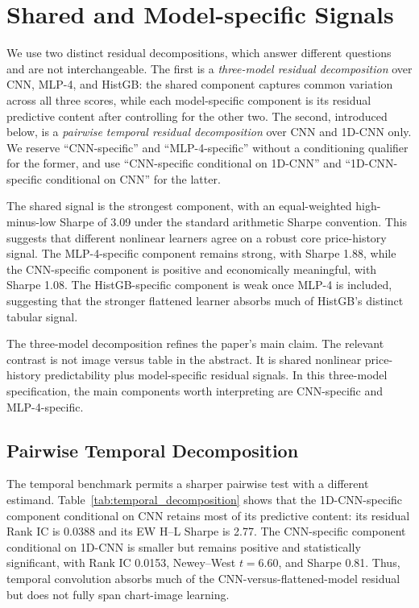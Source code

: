 \section{Shared and Model-specific Signals}

We use two distinct residual decompositions, which answer different questions and are not interchangeable. The first is a \emph{three-model residual decomposition} over CNN, MLP-4, and HistGB: the shared component captures common variation across all three scores, while each model-specific component is its residual predictive content after controlling for the other two. The second, introduced below, is a \emph{pairwise temporal residual decomposition} over CNN and 1D-CNN only. We reserve ``CNN-specific'' and ``MLP-4-specific'' without a conditioning qualifier for the former, and use ``CNN-specific conditional on 1D-CNN'' and ``1D-CNN-specific conditional on CNN'' for the latter.



The shared signal is the strongest component, with an equal-weighted high-minus-low Sharpe of 3.09 under the standard arithmetic Sharpe convention. This suggests that different nonlinear learners agree on a robust core price-history signal. The MLP-4-specific component remains strong, with Sharpe 1.88, while the CNN-specific component is positive and economically meaningful, with Sharpe 1.08. The HistGB-specific component is weak once MLP-4 is included, suggesting that the stronger flattened learner absorbs much of HistGB's distinct tabular signal.

The three-model decomposition refines the paper's main claim. The relevant contrast is not image versus table in the abstract. It is shared nonlinear price-history predictability plus model-specific residual signals. In this three-model specification, the main components worth interpreting are CNN-specific and MLP-4-specific.

\subsection{Pairwise Temporal Decomposition}

The temporal benchmark permits a sharper pairwise test with a different estimand. Table~\ref{tab:temporal_decomposition} shows that the 1D-CNN-specific component conditional on CNN retains most of its predictive content: its residual Rank IC is 0.0388 and its EW H--L Sharpe is 2.77. The CNN-specific component conditional on 1D-CNN is smaller but remains positive and statistically significant, with Rank IC 0.0153, Newey--West $t=6.60$, and Sharpe 0.81. Thus, temporal convolution absorbs much of the CNN-versus-flattened-model residual but does not fully span chart-image learning.


